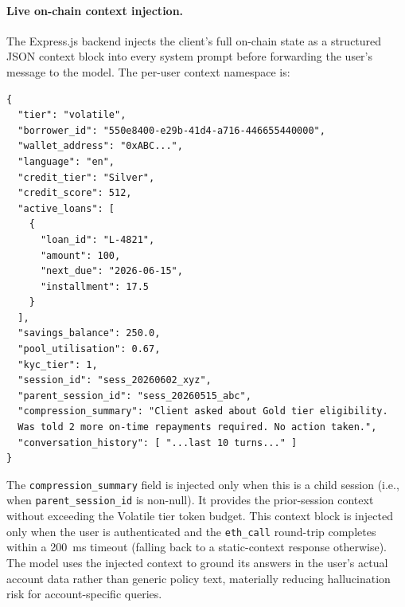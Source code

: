 \documentclass[12pt,a4paper]{article}
\begin{document}
\paragraph{Live on-chain context injection.}
The Express.js backend injects the client's full on-chain state as a structured JSON context block into every system prompt before forwarding the user's message to the model. The per-user context namespace is:
\begin{verbatim}
{
  "tier": "volatile",
  "borrower_id": "550e8400-e29b-41d4-a716-446655440000",
  "wallet_address": "0xABC...",
  "language": "en",
  "credit_tier": "Silver",
  "credit_score": 512,
  "active_loans": [
    {
      "loan_id": "L-4821",
      "amount": 100,
      "next_due": "2026-06-15",
      "installment": 17.5
    }
  ],
  "savings_balance": 250.0,
  "pool_utilisation": 0.67,
  "kyc_tier": 1,
  "session_id": "sess_20260602_xyz",
  "parent_session_id": "sess_20260515_abc",
  "compression_summary": "Client asked about Gold tier eligibility.
  Was told 2 more on-time repayments required. No action taken.",
  "conversation_history": [ "...last 10 turns..." ]
}
\end{verbatim}
The \texttt{compression\_summary} field is injected only when this is a child session (i.e., when \texttt{parent\_session\_id} is non-null). It provides the prior-session context without exceeding the Volatile tier token budget. This context block is injected only when the user is authenticated and the \texttt{eth\_call} round-trip completes within a 200~ms timeout (falling back to a static-context response otherwise). The model uses the injected context to ground its answers in the user's actual account data rather than generic policy text, materially reducing hallucination risk for account-specific queries.
\end{document}

